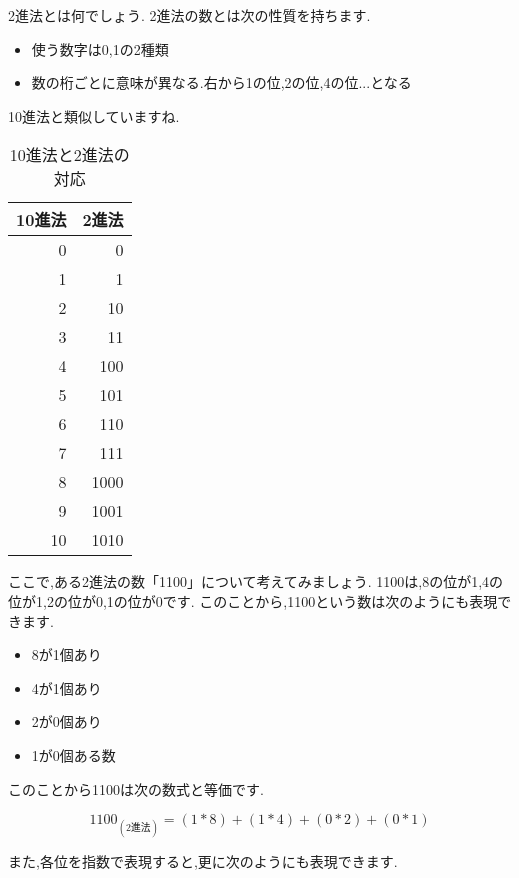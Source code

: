 \documentclass[10pt, twocolumn]{jarticle}
\begin{document}
2進法とは何でしょう.
2進法の数とは次の性質を持ちます.

\begin{itemize}
  \item 使う数字は0,1の2種類
  \item 数の桁ごとに意味が異なる.右から1の位,2の位,4の位...となる
\end{itemize}

10進法と類似していますね.

\begin{table}[h]
\begin{center}
\caption{10進法と2進法の対応}
\begin{tabular}{|r|r|}\hline
  10進法 & 2進法 \\ \hline\hline
       0 &     0 \\ \hline
       1 &     1 \\ \hline
       2 &    10 \\ \hline
       3 &    11 \\ \hline
       4 &   100 \\ \hline
       5 &   101 \\ \hline
       6 &   110 \\ \hline
       7 &   111 \\ \hline
       8 &  1000 \\ \hline
       9 &  1001 \\ \hline
      10 &  1010 \\ \hline
\end{tabular}
\end{center}
\end{table}

ここで,ある2進法の数「1100」について考えてみましょう.
1100は,8の位が1,4の位が1,2の位が0,1の位が0です.
このことから,1100という数は次のようにも表現できます.

\begin{itemize}
  \item 8が1個あり
  \item 4が1個あり
  \item 2が0個あり
  \item 1が0個ある数
\end{itemize}

このことから1100は次の数式と等価です.

\begin{displaymath}
1100_{(2進法)} = (1 * 8) + (1 * 4) + (0 * 2) + (0 * 1)
\end{displaymath}

また,各位を指数で表現すると,更に次のようにも表現できます.
\end{document}
